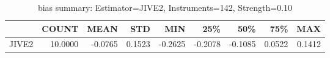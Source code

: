 \begin{table}[ht]
\centering
\caption{bias summary: Estimator=JIVE2, Instruments=142, Strength=0.10}
\begin{tabular}{lrrrrrrrr}
\toprule
 & COUNT & MEAN & STD & MIN & 25\% & 50\% & 75\% & MAX \\
\midrule
JIVE2 & 10.0000 & -0.0765 & 0.1523 & -0.2625 & -0.2078 & -0.1085 & 0.0522 & 0.1412 \\
\bottomrule
\end{tabular}
\end{table}
